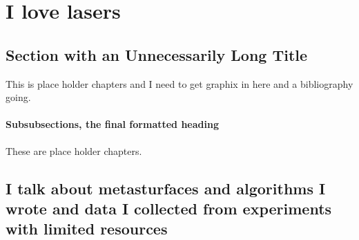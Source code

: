 \chapter{I love lasers}



\section[I love waves]{Section with an Unnecessarily Long Title}

This is place holder chapters and I need to get graphix in here and a bibliography going. 

\subsubsection{Subsubsections, the final formatted heading}

These are place holder chapters. 

\section{I talk about metasturfaces and algorithms I wrote and data I collected from experiments with limited resources}


